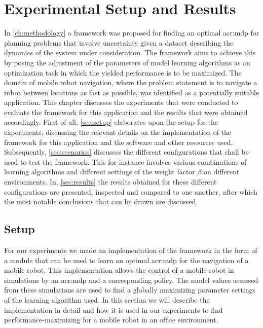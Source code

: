 \chapter{Experimental Setup and Results}
\label{ch:experimental-results}



In \autoref{ch:methodology} a framework was proposed for finding an optimal \acrshort{acr:mdp} for planning problems that involve uncertainty given a dataset describing the dynamics of the system under consideration.
The framework aims to achieve this by posing the adjustment of the parameters of model learning algorithms as an optimization task in which the yielded performance is to be maximized.
The domain of mobile robot navigation, where the problem statement is to navigate a robot between locations as fast as possible, was identified as a potentially suitable application.
This chapter discusses the experiments that were conducted to evaluate the framework for this application and the results that were obtained accordingly.
First of all, \autoref{sec:setup} elaborates upon the setup for the experiments, discussing the relevant details on the implementation of the framework for this application and the software and other resources used.
Subsequently, \autoref{sec:scenarios} discusses the different configurations that shall be used to test the framework.
This for instance involves various combinations of learning algorithms and different settings of the weight factor $\beta$ on different environments.
In, \autoref{sec:results} the results obtained for these different configurations are presented, inspected and compared to one another, after which the most notable conclusions that can be drawn are discussed.

\section{Setup}
\label{sec:setup}

For our experiments we made an implementation of the framework in the form of a module that can be used to learn an optimal \acrshort{acr:mdp} for the navigation of a mobile robot.
This implementation allows the control of a mobile robot in simulations by an \acrshort{acr:mdp} and a corresponding policy.
The model values assessed from these simulations are used to find a globally maximizing parameter settings of the learning algorithm used.
In this section we will describe the implementation in detail and how it is used in our experiments to find performance-maximizing  for a mobile robot in an office environment.

